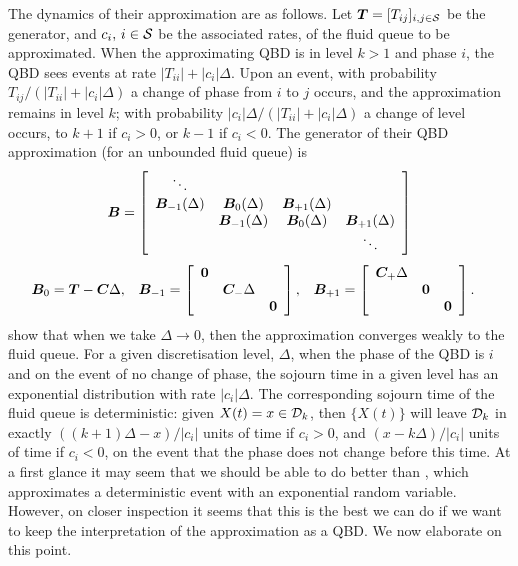 The dynamics of their approximation are as follows. Let \(\boldsymbol T=[T_{ij}]_{i,j\in\mathcal{S}}\) be the generator, and \(c_i,\, i\in\mathcal{S}\) be the associated rates, of the fluid queue to be approximated. When the approximating QBD is in level \(k>1\) and phase \(i\), the QBD sees events at rate \(|T_{ii}| + |c_i|\Delta\). Upon an event, with probability \(T_{ij}/(|T_{ii}| + |c_i|\Delta)\) a change of phase from \(i\) to \(j\) occurs, and the approximation remains in level \(k\); with probability \(|c_i|\Delta/(|T_{ii}| + |c_i|\Delta)\) a change of level occurs, to \(k+1\) if \(c_i>0\), or \(k-1\) if \(c_i<0\). The generator of their QBD approximation (for an unbounded fluid queue) is 
\[\boldsymbol B = \left[ \begin{array}{cccc} \ddots &  &  & \\ \boldsymbol B_{-1}(\Delta) & \boldsymbol B_0(\Delta) & \boldsymbol B_{+1}(\Delta) & \\  & \boldsymbol B_{-1}(\Delta) & \boldsymbol B_0(\Delta) & \boldsymbol B_{+1}(\Delta) \\ &  &  & \ddots \end{array} \right]\]
\begin{align}
\boldsymbol B_0 &= \boldsymbol T- \boldsymbol C\Delta, && \boldsymbol B_{-1} = \left[\begin{array}{ccc} \boldsymbol 0 & & \\ & \boldsymbol C_-\Delta & \\ & & \boldsymbol 0 \end{array}\right], && \boldsymbol B_{+1} = \left[\begin{array}{ccc} \boldsymbol C_+\Delta & & \\ & \boldsymbol 0 & \\ & & \boldsymbol 0\end{array}\right].
\end{align}
\cite{bo2013} show that when we take \(\Delta \to 0\), then the approximation converges weakly to the fluid queue. For a given discretisation level, \(\Delta\), when the phase of the QBD is \(i\) and on the event of no change of phase, the sojourn time in a given level has an exponential distribution with rate \(|c_i|\Delta\). The corresponding sojourn time of the fluid queue is deterministic: given \(X(t) = x \in\mathcal{D}_k\), then \(\{X(t)\}\) will leave \(\mathcal{D}_k\) in exactly \(((k+1)\Delta - x)/|c_i|\) units of time if \(c_i>0\), and \((x-k\Delta)/|c_i|\) units of time if \(c_i<0\), on the event that the phase does not change before this time. At a first glance it may seem that we should be able to do better than \cite{bo2013}, which approximates a deterministic event with an exponential random variable. However, on closer inspection it seems that this is the best we can do if we want to keep the interpretation of the approximation as a QBD. We now elaborate on this point.

